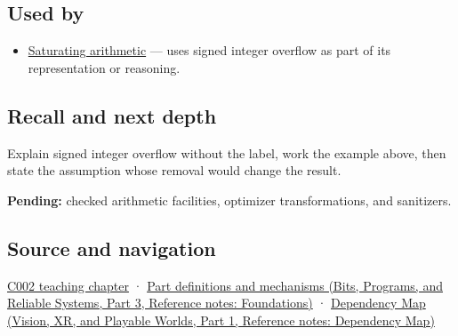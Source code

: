 \subsection{Used by}\label{appendix-1a599c924a4e-used-by}

\hypertarget{appendix-1a599c924a4e-used-by}{}

\begin{itemize}
\tightlist
\item
  \hyperref[appendix-3999c6209649]{Saturating arithmetic} --- uses signed integer overflow as part of its representation or reasoning.
\end{itemize}

\subsection{Recall and next depth}\label{appendix-1a599c924a4e-recall-and-next-depth}

\hypertarget{appendix-1a599c924a4e-recall-and-next-depth}{}

Explain signed integer overflow without the label, work the example above, then state the assumption whose removal would change the result.

\textbf{Pending:} checked arithmetic facilities, optimizer transformations, and sanitizers.

\subsection{Source and navigation}\label{appendix-1a599c924a4e-source-and-navigation}

\hypertarget{appendix-1a599c924a4e-source-and-navigation}{}

\hyperref[01-foundations-i-ch001-arithmetic-becomes-a-policy]{C002 teaching chapter} · \href{../01-Bits-Programs-and-Reliable-Systems-P03/main.pdf\#nameddest=appendix-fd090d982a15}{Part definitions and mechanisms (Bits, Programs, and Reliable Systems, Part 3, Reference notes: Foundations)} · \href{../07-Vision-XR-and-Playable-Worlds-P01/main.pdf\#nameddest=appendix-4ad47bdd269a}{Dependency Map (Vision, XR, and Playable Worlds, Part 1, Reference notes: Dependency Map)}
